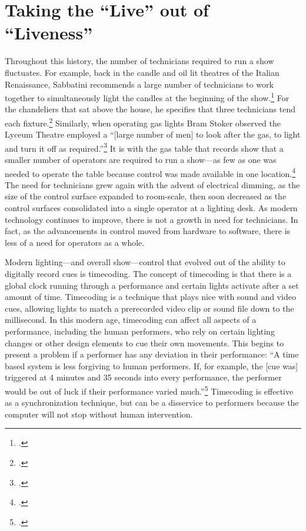 \documentclass[
    12pt,
    twoside,
    bibstyle=chicago,
    headerstyle=uppercase,
	bibfile=biblatex_updating.bib
]{reedthesis}
\begin{document}
\section{Taking the ``Live'' out of ``Liveness''}
Throughout this history, the number of technicians required to run a show fluctuates. For example, back in the candle and oil lit theatres of the Italian Renaissance, Sabbatini recommends a large number of technicians to work together to simultaneously light the candles at the beginning of the show.\footcite[p. 97]{hewittRenaissanceStageDocuments1958} For the chandeliers that sat above the house, he specifies that three technicians tend each fixture.\footcite[p. 98]{hewittRenaissanceStageDocuments1958} Similarly, when operating gas lights Bram Stoker observed the Lyceum Theatre employed a “[large number of men] to look after the gas, to light and turn it off as required.”\footcite[p. 904]{stokerIrvingStageLighting1911} It is with the gas table that records show that a smaller number of operators are required to run a show---as few as one was needed to operate the table because control was made available in one location.\footcite[p. 55]{penzelTheatreLightingElectricity1978} The need for technicians grew again with the advent of electrical dimming, as the size of the control surface expanded to room-scale, then soon decreased as the control surfaces consolidated into a single operator at a lighting desk. As modern technology continues to improve, there is not a growth in need for technicians. In fact, as the advancements in control moved from hardware to software, there is less of a need for operators as a whole.

Modern lighting---and overall show---control that evolved out of the ability to digitally record cues is timecoding. The concept of timecoding is that there is a global clock running through a performance and certain lights activate after a set amount of time. Timecoding is a technique that plays nice with sound and video cues, allowing lights to match a prerecorded video clip or sound file down to the millisecond. In this modern age, timecoding can affect all aspects of a performance, including the human performers, who rely on certain lighting changes or other design elements to cue their own movements. This begins to present a problem if a performer has any deviation in their performance: “A time based system is less forgiving to human performers. If, for example, the [cue was] triggered at 4 minutes and 35 seconds into every performance, the performer would be out of luck if their performance varied much.”\footcite[p. 7]{huntingtonIntroductionShowControl2023} Timecoding is effective as a synchronization technique, but can be a disservice to performers because the computer will not stop without human intervention. 
\end{document}
